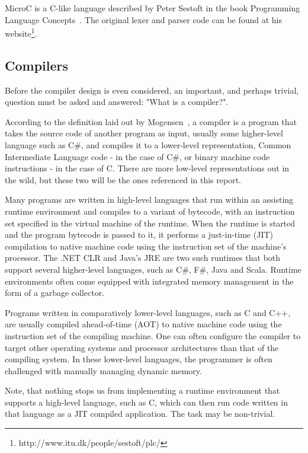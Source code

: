 \documentclass[a4paper]{article}
\begin{document}
MicroC is a C-like language described by Peter Sestoft in the book Programming Language Concepts~\cite{PLC}. The original lexer and parser code can be found at his website\footnote{http://www.itu.dk/people/sestoft/plc/}.

\subsection{Compilers}
Before the compiler design is even considered, an important, and perhaps trivial, question must be asked and answered: "What is a compiler?".

According to the definition laid out by Mogensen~\cite{BCD}, a compiler is a program that takes the source code of another program as input, usually some higher-level language such as C\#, and compiles it to a lower-level representation, Common Intermediate Language code - in the case of C\#, or binary machine code instructions - in the case of C. There are more low-level representations out in the wild, but these two will be the ones referenced in this report.

Many programs are written in high-level languages that run within an assisting runtime environment and compiles to a variant of bytecode, with an instruction set specified in the virtual machine of the runtime. When the runtime is started and the program bytecode is passed to it, it performs a just-in-time (JIT) compilation to native machine code using the instruction set of the machine's processor. The .NET CLR and Java's JRE are two such runtimes that both support several higher-level languages, such as C\#, F\#, Java and Scala. Runtime environments often come equipped with integrated memory management in the form of a garbage collector.

Programs written in comparatively lower-level languages, such as C and C++, are usually compiled ahead-of-time (AOT) to native machine code using the instruction set of the compiling machine. One can often configure the compiler to target other operating systems and processor architectures than that of the compiling system. In these lower-level languages, the programmer is often challenged with manually managing dynamic memory.

Note, that nothing stops us from implementing a runtime environment that supports a high-level language, such as C, which can then run code written in that language as a JIT compiled application. The task may be non-trivial.

\end{document}
